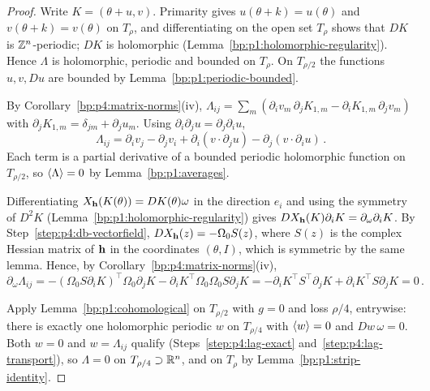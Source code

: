 \begin{proof}
\label{step:p4:lag-regular}
Write $K=(\theta+u,v)$. Primarity gives $u(\theta+k)=u(\theta)$ and $v(\theta+k)=v(\theta)$ on $T_\rho$, and
differentiating on the open set $T_\rho$ shows that $DK$ is $\mathbb{Z}^n$-periodic; $DK$ is holomorphic
(Lemma~\ref{bp:p1:holomorphic-regularity}). Hence $\Lambda$ is holomorphic, periodic and bounded on $T_\rho$. On $T_{\rho/2}$ the
functions $u,v,Du$ are bounded by Lemma~\ref{bp:p1:periodic-bounded}.

\label{step:p4:lag-exact}
By Corollary~\ref{bp:p4:matrix-norms}(iv),
$\Lambda_{ij}=\sum_m(\partial_iv_m\,\partial_jK_{1,m}-\partial_iK_{1,m}\,\partial_jv_m)$ with
$\partial_jK_{1,m}=\delta_{jm}+\partial_ju_m$. Using $\partial_i\partial_ju=\partial_j\partial_iu$,
\begin{equation*}
\Lambda_{ij}=\partial_iv_j-\partial_jv_i+\partial_i(v\cdot\partial_ju)-\partial_j(v\cdot\partial_iu)\,.
\end{equation*}
Each term is a partial derivative of a bounded periodic holomorphic function on $T_{\rho/2}$, so
$\langle \Lambda\rangle=0$ by Lemma~\ref{bp:p1:averages}.

\label{step:p4:lag-transport}
Differentiating $X_{\mathbf{h}}(K(\theta))=DK(\theta)\omega$ in the direction $e_i$ and using the
symmetry of $D^2K$ (Lemma~\ref{bp:p1:holomorphic-regularity}) gives $DX_{\mathbf{h}}(K)\partial_iK=\partial_\omega\partial_iK$. By
Step~\ref{step:p4:db-vectorfield}, $DX_{\mathbf{h}}(z)=-\Omega_0S(z)$, where $S(z)$ is the complex Hessian
matrix of $\mathbf{h}$ in the coordinates $(\theta,I)$, which is symmetric by the same lemma. Hence, by
Corollary~\ref{bp:p4:matrix-norms}(iv),
\begin{equation*}
\partial_\omega\Lambda_{ij}=-(\Omega_0S\partial_iK)^\top\Omega_0\partial_jK-\partial_iK^\top\Omega_0\Omega_0S\partial_jK
=-\partial_iK^\top S^\top\partial_jK+\partial_iK^\top S\partial_jK=0\,.
\end{equation*}

\label{step:p4:lag-unique}
Apply Lemma~\ref{bp:p1:cohomological} on $T_{\rho/2}$ with $g=0$ and loss $\rho/4$, entrywise:
there is exactly one holomorphic periodic $w$ on $T_{\rho/4}$ with $\langle w\rangle=0$ and $Dw\,\omega=0$.
Both $w=0$ and $w=\Lambda_{ij}$ qualify (Steps~\ref{step:p4:lag-exact}
and~\ref{step:p4:lag-transport}), so $\Lambda=0$ on $T_{\rho/4}\supset\mathbb{R}^n$, and on $T_\rho$ by
Lemma~\ref{bp:p1:strip-identity}.
\end{proof}

